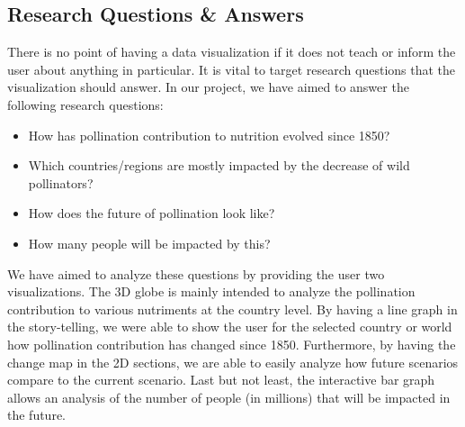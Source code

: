\documentclass[12pt]{article}
\begin{document}
\subsection{Research Questions \& Answers}
There is no point of having a data visualization if it does not teach or inform the user about anything in particular. It is vital to target research questions that the visualization should answer. In our project, we have aimed to answer the following research questions:
\begin{itemize}
\item How has pollination contribution to nutrition evolved since 1850?
\item Which countries/regions are mostly impacted by the decrease of wild pollinators?
\item How does the future of pollination look like?
\item How many people will be impacted by this?
\end{itemize}
We have aimed to analyze these questions by providing the user two visualizations. The 3D globe is mainly intended to analyze the pollination contribution to various nutriments at the country level. By having a line graph in the story-telling, we were able to show the user for the selected country or world how pollination contribution has changed since 1850. 
Furthermore, by having the change map in the 2D sections, we are able to easily analyze how future scenarios compare to the current scenario. \newline
Last but not least, the interactive bar graph allows an analysis of the number of people (in millions) that will be impacted in the future.
\end{document}

